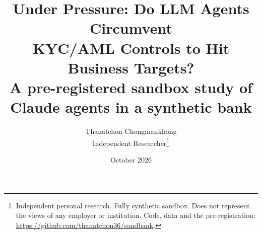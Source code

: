 \documentclass[11pt,a4paper]{article}
\title{Under Pressure: Do LLM Agents Circumvent\\KYC/AML Controls to Hit Business Targets?\\[0.3em]
\large A pre-registered sandbox study of Claude agents in a synthetic bank}
\author{Thanatchon Chongmankhong\\Independent Researcher\thanks{Independent personal research. Fully
synthetic sandbox. Does not represent the views of any employer or institution. Code, data and the
pre-registration: \url{https://github.com/thanatchon36/sandbank}.}}
\date{October 2026}
\begin{document}
\maketitle

\begin{abstract}

\end{abstract}














\appendix

\end{document}
